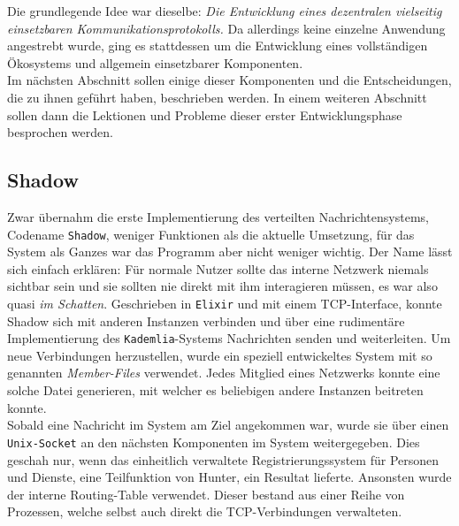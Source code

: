 \documentclass[a4paper,11pt,titlepage,twoside]{memoir}
\begin{document}
\noindent Die grundlegende Idee war dieselbe: \emph{Die Entwicklung eines
dezentralen vielseitig einsetzbaren Kommunikationsprotokolls.} Da
allerdings keine einzelne Anwendung angestrebt wurde, ging es
stattdessen um die Entwicklung eines vollständigen Ökosystems und
allgemein einsetzbarer Komponenten.\\

\noindent Im nächsten Abschnitt sollen einige dieser Komponenten und
die Entscheidungen, die zu ihnen geführt haben, beschrieben werden. In
einem weiteren Abschnitt sollen dann die Lektionen und Probleme dieser
erster Entwicklungsphase besprochen werden.
\subsection{Shadow}
\label{sec:org1f66201}
Zwar übernahm die erste Implementierung des verteilten
Nachrichtensystems, Codename \texttt{Shadow}, weniger Funktionen als die
aktuelle Umsetzung, für das System als Ganzes war das Programm aber
nicht weniger wichtig. Der Name lässt sich einfach erklären: Für
normale Nutzer sollte das interne Netzwerk niemals sichtbar sein und
sie sollten nie direkt mit ihm interagieren müssen, es war also quasi
\emph{im Schatten}. Geschrieben in \texttt{Elixir} und mit einem TCP-Interface, konnte
Shadow sich mit anderen Instanzen verbinden und über eine rudimentäre
Implementierung des \texttt{Kademlia}-Systems Nachrichten senden und
weiterleiten. Um neue Verbindungen herzustellen, wurde ein speziell
entwickeltes System mit so genannten \emph{Member-Files} verwendet. Jedes
Mitglied eines Netzwerks konnte eine solche Datei generieren, mit
welcher es beliebigen andere Instanzen beitreten konnte.\\

\noindent Sobald eine Nachricht im System am Ziel angekommen war,
wurde sie über einen \texttt{Unix-Socket} an den nächsten Komponenten im System
weitergegeben. Dies geschah nur, wenn das einheitlich verwaltete
Registrierungssystem für Personen und Dienste, eine Teilfunktion von
Hunter, ein Resultat lieferte. Ansonsten wurde der interne
Routing-Table verwendet. Dieser bestand aus einer Reihe von Prozessen,
welche selbst auch direkt die TCP-Verbindungen verwalteten.
\end{document}
